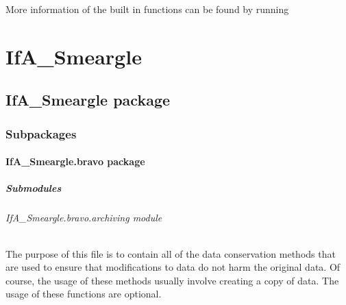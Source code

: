 \documentclass[letterpaper,10pt,english]{sphinxmanual}
\begin{document}
More information of the built in functions can be found by running 


\chapter{IfA\_Smeargle}
\label{\detokenize{python_docstrings/modules:ifa-smeargle}}\label{\detokenize{python_docstrings/modules::doc}}

\section{IfA\_Smeargle package}
\label{\detokenize{python_docstrings/IfA_Smeargle:ifa-smeargle-package}}\label{\detokenize{python_docstrings/IfA_Smeargle::doc}}

\subsection{Subpackages}
\label{\detokenize{python_docstrings/IfA_Smeargle:subpackages}}

\subsubsection{IfA\_Smeargle.bravo package}
\label{\detokenize{python_docstrings/IfA_Smeargle.bravo:ifa-smeargle-bravo-package}}\label{\detokenize{python_docstrings/IfA_Smeargle.bravo::doc}}

\paragraph{Submodules}
\label{\detokenize{python_docstrings/IfA_Smeargle.bravo:submodules}}

\subparagraph{IfA\_Smeargle.bravo.archiving module}
\label{\detokenize{python_docstrings/IfA_Smeargle.bravo.archiving:module-IfA_Smeargle.bravo.archiving}}\label{\detokenize{python_docstrings/IfA_Smeargle.bravo.archiving:ifa-smeargle-bravo-archiving-module}}\label{\detokenize{python_docstrings/IfA_Smeargle.bravo.archiving::doc}}
The purpose of this file is to contain all of the data conservation methods
that are used to ensure that modifications to data do not harm the original
data. Of course, the usage of these methods usually involve creating a
copy of data. The usage of these functions are optional.
\end{document}
